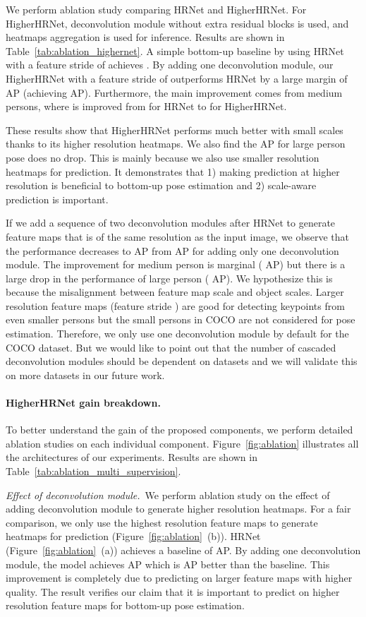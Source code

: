 \documentclass[10pt,twocolumn,letterpaper]{article}
\begin{document}
We perform ablation study comparing HRNet and HigherHRNet. For HigherHRNet, deconvolution module without extra residual blocks is used, and heatmaps aggregation is used for inference. Results are shown in Table~\ref{tab:ablation_highernet}. A simple bottom-up baseline by using HRNet with a feature stride of  achieves . By adding one deconvolution module, our HigherHRNet with a feature stride of  outperforms HRNet by a large margin of  AP (achieving  AP). Furthermore, the main improvement comes from medium persons, where  is improved from  for HRNet to  for HigherHRNet.

These results show that HigherHRNet performs much better with small scales thanks to its higher resolution heatmaps. We also find the AP for large person pose does no drop. This is mainly because we also use smaller resolution heatmaps for prediction. It demonstrates that 1) making prediction at higher resolution is beneficial to bottom-up pose estimation and 2) scale-aware prediction is important.

If we add a sequence of two deconvolution modules after HRNet to generate feature maps that is of the same resolution as the input image, we observe that the performance decreases to  AP from  AP for adding only one deconvolution module. The improvement for medium person is marginal ( AP) but there is a large drop in the performance of large person ( AP). We hypothesize this is because the misalignment between feature map scale and object scales. Larger resolution feature maps (feature stride ) are good for detecting keypoints from even smaller persons but the small persons in COCO are not considered for pose estimation. Therefore, we only use one deconvolution module by default for the COCO dataset. But we would like to point out that the number of cascaded deconvolution modules should be dependent on datasets and we will validate this on more datasets in our future work.
\vspace{-4mm}
\paragraph{HigherHRNet gain breakdown.}

To better understand the gain of the proposed components, we perform detailed ablation studies on each individual component. Figure~\ref{fig:ablation} illustrates all the architectures of our experiments. Results are shown in Table~\ref{tab:ablation_multi_supervision}.

\noindent\emph{Effect of deconvolution module.}~We perform ablation study on the effect of adding deconvolution module to generate higher resolution heatmaps. For a fair comparison, we only use the highest resolution feature maps to generate heatmaps for prediction (Figure~\ref{fig:ablation}~(b)). HRNet (Figure~\ref{fig:ablation}~(a)) achieves a baseline of  AP. By adding one deconvolution module, the model achieves  AP which is  AP better than the baseline. This improvement is completely due to predicting on larger feature maps with higher quality. The result verifies our claim that it is important to predict on higher resolution feature maps for bottom-up pose estimation. 
\end{document}
